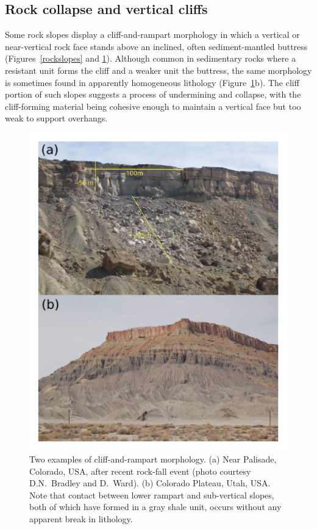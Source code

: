 \documentclass[esurf, manuscript]{copernicus}
\begin{document}
\subsection{Rock collapse and vertical cliffs}

Some rock slopes display a cliff-and-rampart morphology in which a vertical or near-vertical rock face stands above an inclined, often sediment-mantled buttress (Figures~\ref{rockslopes} and \ref{clifframpart}). Although common in sedimentary rocks where a resistant unit forms the cliff and a weaker unit the buttress, the same morphology is sometimes found in apparently homogeneous lithology (Figure~\ref{clifframpart}b). The cliff portion of such slopes suggests a process of undermining and collapse, with the cliff-forming material being cohesive enough to maintain a vertical face but too weak to support overhangs. 

\begin{figure}[t]
\includegraphics[width=12cm]{Figures/cliff_rampart_examples.pdf}
\caption{Two examples of cliff-and-rampart morphology. (a) Near Palisade, Colorado, USA, after recent rock-fall event (photo courtesy D.N.~Bradley and D.~Ward). (b) Colorado Plateau, Utah, USA. Note that contact between lower rampart and sub-vertical slopes, both of which have formed in a gray shale unit, occurs without any apparent break in lithology.}
\label{clifframpart}
\end{figure}
\end{document}
